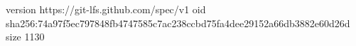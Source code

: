 version https://git-lfs.github.com/spec/v1
oid sha256:74a97f5ec797848fb4747585c7ac238ccbd75fa4dee29152a66db3882e60d26d
size 1130
